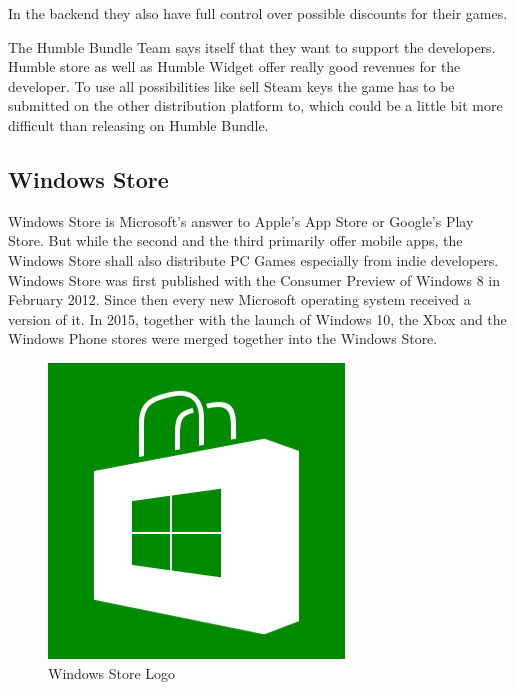 In the backend they also have full control over possible discounts for their games.

The Humble Bundle Team says itself that they want to support the developers. Humble store as well as Humble Widget offer really good revenues for the developer. To use all possibilities like sell Steam keys the game has to be submitted on the other distribution platform to, which could be a little bit more difficult than releasing on Humble Bundle.


\subsection{Windows Store}
\label{subsec:windows_Store}
Windows Store is Microsoft's answer to Apple's App Store or Google's Play Store. But while the second and the third primarily offer mobile apps, the Windows Store shall also distribute PC Games especially from indie developers. Windows Store was first published with the Consumer Preview of Windows 8 in February 2012. Since then every new Microsoft operating system received a version of it. In 2015, together with the launch of Windows 10, the Xbox and the Windows Phone stores were merged together into the Windows Store. \citep{microsoft_publish_2016}

\begin{figure}[!hbp]
\includegraphics[width=\linewidth]{img/windows-store.png}
\centering
\caption{ Windows Store Logo }
\label{fig:windows}
\end{figure}

